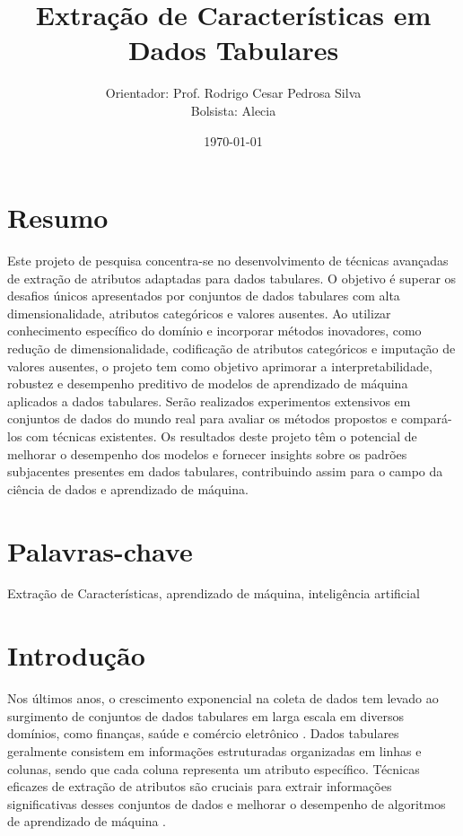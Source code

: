 \documentclass{article}
\title{Extração de Características em Dados Tabulares}
\author{Orientador: Prof. Rodrigo Cesar Pedrosa Silva \\
Bolsista: Alecia}
\date{\today}
\begin{document}
\maketitle

\section*{Resumo}
Este projeto de pesquisa concentra-se no desenvolvimento de técnicas avançadas de extração de atributos adaptadas para dados tabulares. O objetivo é superar os desafios únicos apresentados por conjuntos de dados tabulares com alta dimensionalidade, atributos categóricos e valores ausentes. Ao utilizar conhecimento específico do domínio e incorporar métodos inovadores, como redução de dimensionalidade, codificação de atributos categóricos e imputação de valores ausentes, o projeto tem como objetivo aprimorar a interpretabilidade, robustez e desempenho preditivo de modelos de aprendizado de máquina aplicados a dados tabulares. Serão realizados experimentos extensivos em conjuntos de dados do mundo real para avaliar os métodos propostos e compará-los com técnicas existentes. Os resultados deste projeto têm o potencial de melhorar o desempenho dos modelos e fornecer insights sobre os padrões subjacentes presentes em dados tabulares, contribuindo assim para o campo da ciência de dados e aprendizado de máquina.
   
\section*{Palavras-chave}
    Extração de Características, aprendizado de máquina, inteligência artificial

\section{Introdução}
	
Nos últimos anos, o crescimento exponencial na coleta de dados tem levado ao surgimento de conjuntos de dados tabulares em larga escala em diversos domínios, como finanças, saúde e comércio eletrônico \cite{hastie2009elements}. Dados tabulares geralmente consistem em informações estruturadas organizadas em linhas e colunas, sendo que cada coluna representa um atributo específico. Técnicas eficazes de extração de atributos são cruciais para extrair informações significativas desses conjuntos de dados e melhorar o desempenho de algoritmos de aprendizado de máquina \cite{mutlag2020feature}.
\end{document}
